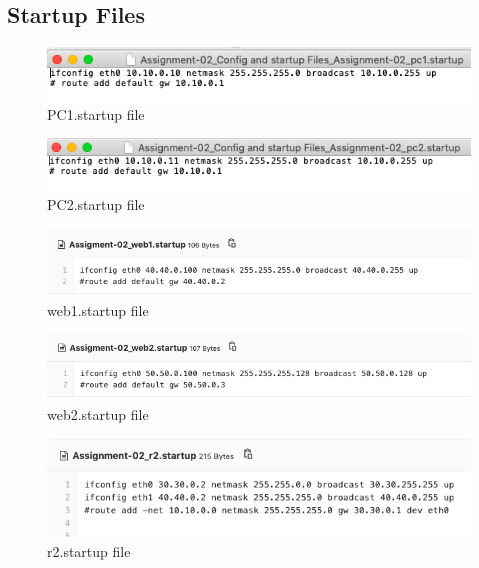 \subsection{Startup Files}
\begin{figure}[H]
\centering
  \includegraphics[width=400pt]{Images/PC1.startup.png}
  \caption{PC1.startup file}
  \label{fig:2.4}
\end{figure}
\begin{figure}[H]
\centering
  \includegraphics[width=400pt]{Images/pc2.startup.png}
  \caption{PC2.startup file}
  \label{fig:2.5}
\end{figure}
\begin{figure}[H]
\centering
  \includegraphics[width=400pt]{Images/web1.startup.png}
  \caption{web1.startup file}
  \label{fig:2.6}
\end{figure}
\begin{figure}[H]
\centering
  \includegraphics[width=400pt]{Images/web2.startup.png}
  \caption{web2.startup file}
  \label{fig:2.7}
\end{figure}
\begin{figure}[H]
\centering
  \includegraphics[width=400pt]{Images/r2.startup.png}
  \caption{r2.startup file}
  \label{fig:2.8}
\end{figure}
